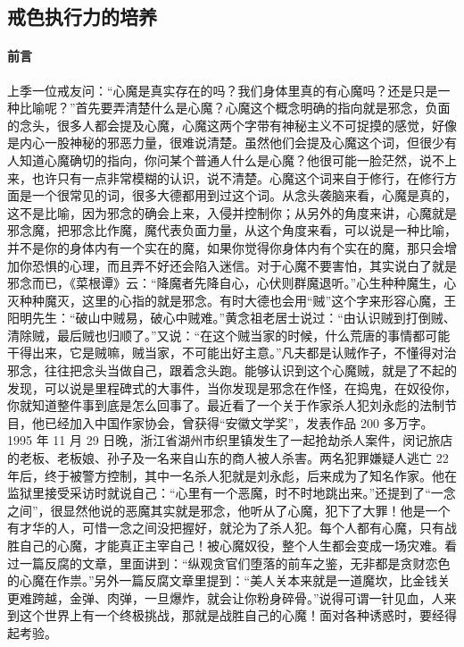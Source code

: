 \subsection{戒色执行力的培养}

\paragraph{前言}

上季一位戒友问：“心魔是真实存在的吗？我们身体里真的有心魔吗？还是只是一种比喻呢？”首先要弄清楚什么是心魔？心魔这个概念明确的指向就是邪念，负面的念头，很多人都会提及心魔，心魔这两个字带有神秘主义不可捉摸的感觉，好像是内心一股神秘的邪恶力量，很难说清楚。虽然他们会提及心魔这个词，但很少有人知道心魔确切的指向，你问某个普通人什么是心魔？他很可能一脸茫然，说不上来，也许只有一点非常模糊的认识，说不清楚。心魔这个词来自于修行，在修行方面是一个很常见的词，很多大德都用到过这个词。从念头袭脑来看，心魔是真的，这不是比喻，因为邪念的确会上来，入侵并控制你；从另外的角度来讲，心魔就是邪念魔，把邪念比作魔，魔代表负面力量，从这个角度来看，可以说是一种比喻，并不是你的身体内有一个实在的魔，如果你觉得你身体内有个实在的魔，那只会增加你恐惧的心理，而且弄不好还会陷入迷信。对于心魔不要害怕，其实说白了就是邪念而已，《菜根谭》云：“降魔者先降自心，心伏则群魔退听。”心生种种魔生，心灭种种魔灭，这里的心指的就是邪念。有时大德也会用“贼”这个字来形容心魔，王阳明先生：“破山中贼易，破心中贼难。”黄念祖老居士说过：“由认识贼到打倒贼、清除贼，最后贼也归顺了。”又说：“在这个贼当家的时候，什么荒唐的事情都可能干得出来，它是贼嘛，贼当家，不可能出好主意。”凡夫都是认贼作子，不懂得对治邪念，往往把念头当做自己，跟着念头跑。能够认识到这个心魔贼，就是了不起的发现，可以说是里程碑式的大事件，当你发现是邪念在作怪，在捣鬼，在奴役你，你就知道整件事到底是怎么回事了。最近看了一个关于作家杀人犯刘永彪的法制节目，他已经加入中国作家协会，曾获得“安徽文学奖”，发表作品 200 多万字。1995 年 11 月 29 日晚，浙江省湖州市织里镇发生了一起抢劫杀人案件，闵记旅店的老板、老板娘、孙子及一名来自山东的商人被人杀害。两名犯罪嫌疑人逃亡 22 年后，终于被警方控制，其中一名杀人犯就是刘永彪，后来成为了知名作家。他在监狱里接受采访时就说自己：“心里有一个恶魔，时不时地跳出来。”还提到了“一念之间”，很显然他说的恶魔其实就是邪念，他听从了心魔，犯下了大罪！他是一个有才华的人，可惜一念之间没把握好，就沦为了杀人犯。每个人都有心魔，只有战胜自己的心魔，才能真正主宰自己！被心魔奴役，整个人生都会变成一场灾难。看过一篇反腐的文章，里面讲到：“纵观贪官们堕落的前车之鉴，无非都是贪财恋色的心魔在作祟。”另外一篇反腐文章里提到：“美人关本来就是一道魔坎，比金钱关更难跨越，金弹、肉弹，一旦爆炸，就会让你粉身碎骨。”说得可谓一针见血，人来到这个世界上有一个终极挑战，那就是战胜自己的心魔！面对各种诱惑时，要经得起考验。

